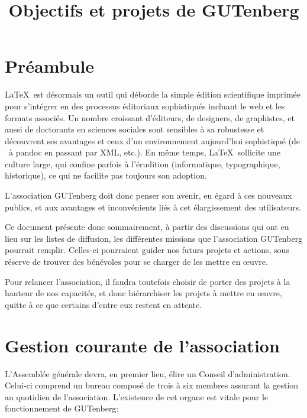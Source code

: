 \documentclass{tufte-handout}
\title{Objectifs et projets de GUTenberg}
\author{}
\date{}
\newcommand{\ratio}[3][]{\marginpar{\footnotesize{\textcolor{teal}{Temps requis: #2 / Utilité: #3}\par\noindent \textcolor{teal}{#1}}}}
\begin{document}
\maketitle


\section*{Préambule}

\LaTeX\ est désormais un outil qui déborde la simple édition scientifique
imprimée pour s'intégrer en des processus éditoriaux sophistiqués incluant le
web et les formats associés. Un nombre croissant d'éditeurs, de designers, de
graphistes, et aussi de doctorants en sciences sociales sont sensibles à sa
robustesse et découvrent ses avantages et ceux d'un environnement aujourd'hui
sophistiqué (de \LuaLaTeX\ à pandoc en passant par XML, etc.). En même temps,
\LaTeX\ sollicite une culture large, qui confine parfois à l'érudition
(informatique, typographique, historique), ce qui ne facilite pas toujours son
adoption.

L'association GUTenberg doit donc penser son avenir, eu égard à ces nouveaux
publics, et aux avantages et inconvénients liés à cet élargissement des
utilisateurs.

Ce document présente donc sommairement, à partir des discussions qui ont eu lieu
sur les listes de diffusion, les différentes missions que l'association
GUTenberg pourrait remplir. Celles-ci pourraient guider nos futurs projets et
actions, sous réserve de trouver des bénévoles pour se charger de les mettre en
œuvre.

Pour relancer l'association, il faudra toutefois choisir de porter des projets
à la hauteur de nos capacités, et donc hiérarchiser les projets à mettre en
œuvre, quitte à ce que certains d'entre eux restent en attente.

\tableofcontents

\clearpage


\section{Gestion courante de l'association}

L'Assemblée générale\ratio[Investissement régulier et dans la durée, les mandats
durant 4 ans]{+++}{+++} devra, en premier lieu, élire un Conseil
d'administration. Celui-ci comprend un bureau composé de trois à six membres
assurant la gestion au quotidien de l'association. L'existence de cet organe est
vitale pour le fonctionnement de GUTenberg:
\end{document}
